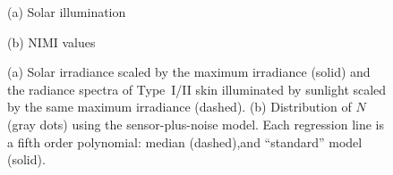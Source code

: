 \documentclass[10pt,journal,cspaper,compsoc]{IEEEtran}
\begin{document}
\begin{figure}
\begin{minipage}[b]{0.48\linewidth}
  \centering
 \centerline{}
  \centerline{(a) Solar illumination}\medskip
\end{minipage}
\hfill
\begin{minipage}[b]{0.48\linewidth}
  \centering
 \centerline{}
  \centerline{(b) NIMI values}\medskip
\end{minipage}
\vspace{-0.5cm}
\caption{
(a) Solar irradiance scaled by the maximum irradiance (solid) and the radiance spectra of Type~I/II skin 
illuminated by sunlight scaled by the same maximum irradiance (dashed).
(b) Distribution of $N$ (gray dots) using the sensor-plus-noise model. Each regression line is 
a fifth order polynomial: median (dashed),and ``standard'' model (solid).}
\label{nimivals:fig}
\end{figure}
\end{document}
